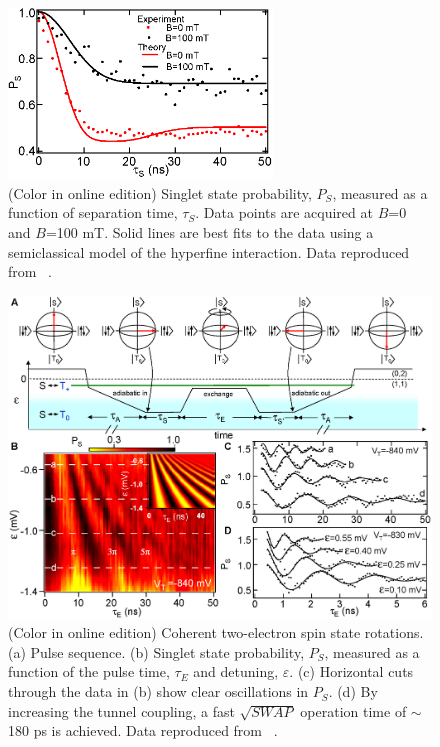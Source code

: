 \documentclass[rmp,twocolumn,aps]{revtex4}
\begin{document}
\begin{figure}[htb]
\includegraphics[width=7cm]{hanson_fig47.eps}
\caption{(Color in online edition) Singlet state probability, $P_{S}$, measured as a
function of separation time, $\tau_{S}$. Data points are acquired
at $B$=0 and $B$=100 mT. Solid lines are best fits to the data
using a semiclassical model of the hyperfine interaction. Data
reproduced from ~\textcite{petta05}.}
\label{Fig:SingletDecay}
\end{figure}

\begin{figure}[htb]
\includegraphics[width=14cm]{hanson_fig48.eps}
\caption{(Color in online edition) Coherent two-electron spin state rotations. (a) Pulse
sequence. (b) Singlet state probability, $P_{S}$, measured as a
function of the pulse time, $\tau_{E}$ and detuning,
$\varepsilon$. (c) Horizontal cuts through the data in (b) show clear
oscillations in $P_{S}$. (d) By increasing the tunnel coupling, a
fast $\sqrt{SWAP}$ operation time of $\sim$180 ps is achieved. Data
reproduced from ~\textcite{petta05}.}
\label{Fig:SWAP}
\end{figure}
\end{document}
